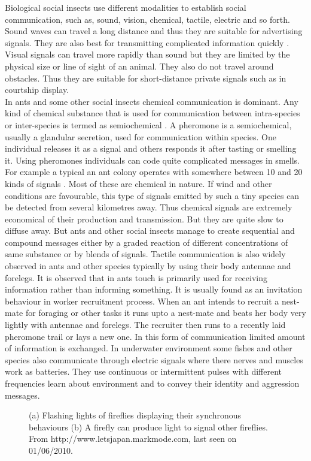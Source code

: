 Biological social insects use different modalities to establish social communication, such as, sound, vision, chemical, tactile,  electric and so forth.  Sound waves can travel a long distance and thus they are suitable for advertising signals. They are also best for transmitting complicated information quickly \cite{Slater1986}. Visual signals can travel more rapidly than sound but they are limited by the physical size or line of sight of an animal. They also do not travel around obstacles. Thus they are suitable for short-distance private signals such as in courtship display.\\
% 
In ants and some other social insects chemical communication is dominant. Any kind of chemical substance that is used for communication between intra-species or inter-species is termed as semiochemical \cite{Holldobler1990}. A pheromone is a semiochemical, usually a glandular secretion, used for communication within species. One individual releases it as a signal and others responds it after tasting or smelling it. Using pheromones individuals can code quite complicated messages in smells. For example a typical an ant colony operates with somewhere between 10 and 20 kinds of signals \cite{Holldobler1990}. Most of these are chemical in nature. If wind and other conditions are favourable,  this type of signals emitted by such a tiny species can be detected from several kilometres away. Thus chemical signals are extremely economical of their production and transmission. But they are quite slow to diffuse away. But ants and other social insects manage to create sequential and compound messages either by a graded reaction of different concentrations of same substance or by blends of signals.
Tactile communication is also widely observed in ants and other species typically by using their body antennae and forelegs. It is observed that in ants touch is primarily used  for receiving information rather than informing something. It is usually found as an invitation behaviour in worker recruitment process. When an ant intends to recruit a nest-mate for foraging or other tasks it runs upto a nest-mate and beats her body very lightly with  antennae and forelegs. The recruiter then runs to a recently laid pheromone trail or lays a new one. In this form of communication limited amount of information is exchanged. In underwater environment some fishes and other species also communicate through electric signals where there nerves and muscles work as batteries. They use continuous or intermittent pulses with  different frequencies learn about environment and to convey their identity and aggression messages.
\begin{figure}[htp]
\centering
{} 
\hspace{0.25cm}
\caption{(a) Flashing lights of fireflies displaying their synchronous behaviours (b) A firefly can produce light to signal other fireflies. From http://www.letsjapan.markmode.com, last seen on 01/06/2010.}
\label{fig:fireflies}
\end{figure}

